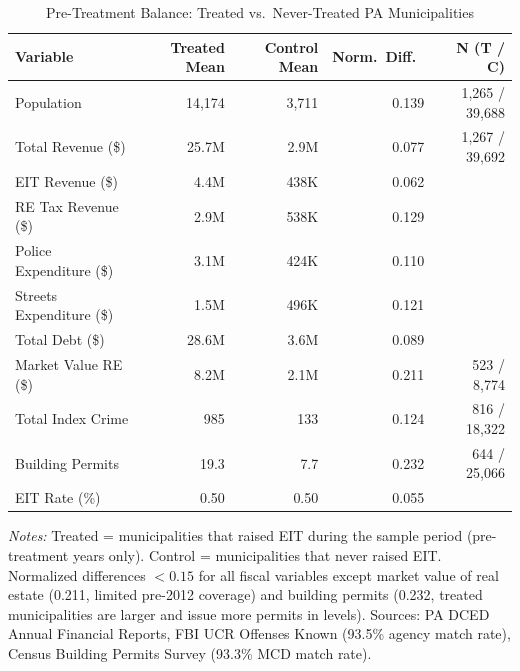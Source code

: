 \documentclass[12pt]{article}
\begin{document}
\begin{table}[H]
    \centering
    \caption{Pre-Treatment Balance: Treated vs.\ Never-Treated PA Municipalities}
    \label{tab:balance}
    \small
    \begin{tabular}{lrrrr}
        \toprule
        Variable & Treated Mean & Control Mean & Norm.\ Diff.\ & N (T / C) \\
        \midrule
        Population              & 14{,}174   & 3{,}711    & 0.139 & 1{,}265 / 39{,}688 \\
        Total Revenue (\$)     & 25.7M      & 2.9M       & 0.077 & 1{,}267 / 39{,}692 \\
        EIT Revenue (\$)       & 4.4M       & 438K       & 0.062 &                     \\
        RE Tax Revenue (\$)    & 2.9M       & 538K       & 0.129 &                     \\
        Police Expenditure (\$)& 3.1M       & 424K       & 0.110 &                     \\
        Streets Expenditure (\$)& 1.5M      & 496K       & 0.121 &                     \\
        Total Debt (\$)        & 28.6M      & 3.6M       & 0.089 &                     \\
        Market Value RE (\$)   & 8.2M       & 2.1M       & 0.211 & 523 / 8{,}774       \\
        Total Index Crime       & 985        & 133        & 0.124 & 816 / 18{,}322      \\
        Building Permits        & 19.3       & 7.7        & 0.232 & 644 / 25{,}066      \\
        EIT Rate (\%)          & 0.50       & 0.50       & 0.055 &                     \\
        \bottomrule
    \end{tabular}
    \vspace{0.3em}
    \begin{minipage}{0.85\textwidth}
        \footnotesize \textit{Notes:} Treated = municipalities that raised EIT during the
        sample period (pre-treatment years only). Control = municipalities that never raised
        EIT. Normalized differences $<0.15$ for all fiscal variables except market
        value of real estate (0.211, limited pre-2012 coverage) and building permits
        (0.232, treated municipalities are larger and issue more permits in levels).
        Sources: PA DCED Annual Financial Reports, FBI UCR Offenses Known
        (93.5\% agency match rate), Census Building Permits Survey
        (93.3\% MCD match rate).
    \end{minipage}
\end{table}
\end{document}
